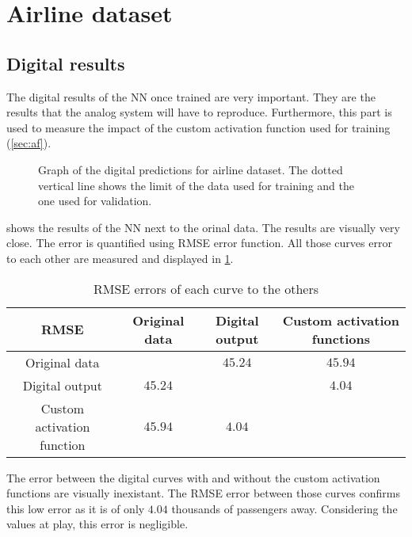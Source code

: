 \section{Airline dataset}
\label{sec:resAirline}

\subsection{Digital results}
\label{subsec:digitalAirline}

The digital results of the \ac{NN} once trained are very important. They are the results that the analog system will have to reproduce. Furthermore, this part is used to measure the impact of the custom activation function used for training (\cref{sec:af}).

\begin{figure}[H]
  \centering
  
  \caption{Graph of the digital predictions for airline dataset. The dotted vertical line shows the limit of the data used for training and the one used for validation.}
  \label{graph:airlineDigital}
\end{figure}

 shows the results of the \ac{NN} next to the orinal data. The results are visually very close. The error is quantified using \ac{RMSE} error function. All those curves error to each other are measured and displayed in \cref{tab:airlineDigital}.

\begin{table}[H]
  \centering
  \begin{tabular}{|c|c|c|c|}
    \hline
    \cellcolor[HTML]{808080}\acs{RMSE} & Original data & Digital output & Custom activation functions\\
    \hline
    Original data &\cellcolor[HTML]{202020} & $45.24$ & $45.94$\\
    \hline
    Digital output & $45.24$ & \cellcolor[HTML]{202020} & $4.04$\\
    \hline
    Custom activation function & $45.94$ & $4.04$ & \cellcolor[HTML]{202020}\\
    \hline
  \end{tabular}
  \caption{\ac{RMSE} errors of each curve to the others}
  \label{tab:airlineDigital}
\end{table}

The error between the digital curves with and without the custom activation functions are visually inexistant. The \ac{RMSE} error between those curves confirms this low error as it is of only $4.04$ thousands of passengers away. Considering the values at play, this error is negligible.

